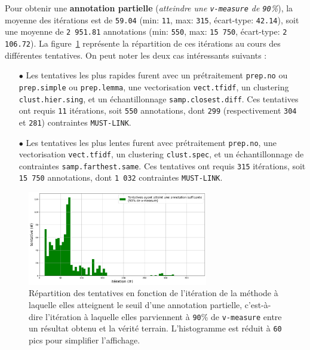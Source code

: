 			Pour obtenir une \textbf{annotation partielle} (\textit{atteindre une \texttt{v-measure} de \texttt{90}\%}), la moyenne des itérations est de \texttt{59.04} (min: \texttt{11}, max: \texttt{315}, écart-type: \texttt{42.14}), soit une moyenne de \texttt{2 951.81} annotations (min: \texttt{550}, max: \texttt{15 750}, écart-type: \texttt{2 106.72}).
			La figure~\ref{figure:4.2.1-ETUDE-OPTIMISATION-HISTOGRAMME-ANNOTATION-PARTIELLE} représente la répartition de ces itérations au cours des différentes tentatives.
			On peut noter les deux cas intéressants suivants :
			\begin{itemize}
				\item[\(\bullet\)] Les tentatives les plus rapides furent avec un prétraitement \texttt{prep.no} ou \texttt{prep.simple} ou \texttt{prep.lemma}, une vectorisation \texttt{vect.tfidf}, un clustering \texttt{clust.hier.sing}, et un échantillonnage \texttt{samp.closest.diff}. Ces tentatives ont requis \texttt{11} itérations, soit \texttt{550} annotations, dont \texttt{299} (respectivement \texttt{304} et \texttt{281}) contraintes \texttt{MUST-LINK}.
				\item[\(\bullet\)] Les tentatives les plus lentes furent avec prétraitement \texttt{prep.no}, une vectorisation \texttt{vect.tfidf}, un clustering \texttt{clust.spec}, et un échantillonnage de contraintes \texttt{samp.farthest.same}. Ces tentatives ont requis \texttt{315} itérations, soit \texttt{15 750} annotations, dont \texttt{1 032} contraintes \texttt{MUST-LINK}.
			\end{itemize}
			\begin{figure}[H]
				\centering
				\includegraphics[width=0.7\textwidth]{figures/etude-efficience-histogramme-annotation-partielle}
				\caption{Répartition des tentatives en fonction de l'itération de la méthode à laquelle elles atteignent le seuil d'une annotation partielle, c'est-à-dire l'itération à laquelle elles parviennent à \texttt{90}\% de \texttt{v-measure} entre un résultat obtenu et la vérité terrain. L'histogramme est réduit à \texttt{60} pics pour simplifier l'affichage.}
				\label{figure:4.2.1-ETUDE-OPTIMISATION-HISTOGRAMME-ANNOTATION-PARTIELLE}
			\end{figure}

